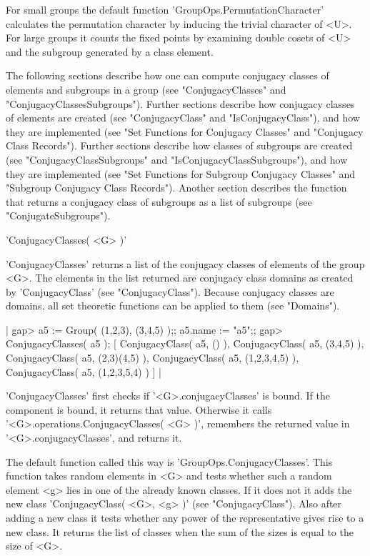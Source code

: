 For  small  groups the default  function  'GroupOps.PermutationCharacter'
calculates the permutation character by inducing the trivial character of
<U>.  For  large  groups  it counts the  fixed points by examining double
cosets of <U> and the subgroup generated by a class element.


The following sections describe how  one can compute conjugacy classes of
elements   and   subgroups  in a    group    (see "ConjugacyClasses"  and
"ConjugacyClassesSubgroups").  Further sections   describe how  conjugacy
classes    of    elements are     created   (see  "ConjugacyClass"    and
"IsConjugacyClass"), and how they are implemented (see "Set Functions for
Conjugacy  Classes" and   "Conjugacy  Class Records").  Further  sections
describe  how      classes     of    subgroups   are     created     (see
"ConjugacyClassSubgroups" and "IsConjugacyClassSubgroups"), and how  they
are implemented (see "Set Functions  for Subgroup Conjugacy Classes"  and
"Subgroup  Conjugacy  Class  Records").   Another  section describes  the
function that  returns   a conjugacy  class   of subgroups as  a list  of
subgroups (see "ConjugateSubgroups").


'ConjugacyClasses( <G> )'

'ConjugacyClasses' returns a list of the conjugacy classes of elements of
the group  <G>.   The elements in the list returned  are conjugacy  class
domains  as created  by 'ConjugacyClass' (see "ConjugacyClass").  Because
conjugacy classes are domains, all set theoretic functions can be applied
to them (see "Domains").

|    gap> a5 := Group( (1,2,3), (3,4,5) );;  a5.name := "a5";;
    gap> ConjugacyClasses( a5 );
    [ ConjugacyClass( a5, () ), ConjugacyClass( a5, (3,4,5) ), 
      ConjugacyClass( a5, (2,3)(4,5) ), ConjugacyClass( a5, (1,2,3,4,5) ), 
      ConjugacyClass( a5, (1,2,3,5,4) ) ] |

'ConjugacyClasses' first checks  if '<G>.conjugacyClasses' is  bound.  If
the component  is  bound,  it  returns  that value.   Otherwise it  calls
'<G>.operations.ConjugacyClasses( <G> )', remembers the returned value in
'<G>.conjugacyClasses', and returns it.

The  default  function  called this  way  is 'GroupOps.ConjugacyClasses'.
This  function takes  random  elements in  <G> and tests whether  such  a
random element <g> lies in one of the already known classes.   If it does
not  it  adds   the   new  class   'ConjugacyClass(  <G>,  <g>   )'  (see
"ConjugacyClass").  Also after adding  a new  class it tests  whether any
power  of  the representative gives rise  to a new class.  It returns the
list of classes when the sum of the sizes is equal to the size of <G>.

